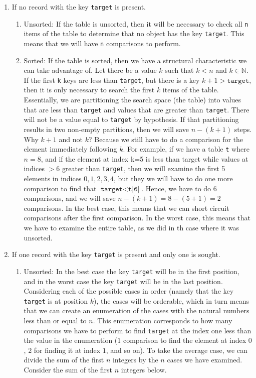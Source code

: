 \documentclass[10pt,letterpaper,final]{report}
\begin{document}
\begin{enumerate}
  \item If no record with the key \texttt{target} is present.
        \begin{enumerate}
          \item Unsorted: If the table is unsorted, then it will be necessary to check all \texttt{n} items of the table to determine that no object has the key \texttt{target}. This means that we will have \texttt{n} comparisons to perform.
          \item Sorted: If the table is sorted, then we have a structural characteristic we can take advantage of. Let there be a value $k$ such that $k < n$ and $k \in \mathbb{N}$. If the first \texttt{k} keys are less than \texttt{target}, but there is a key $k+1 > \texttt{target}$, then it is only necessary to search the first $k$ items of the table. Essentially, we are partitioning the search space (the table) into values that are less than \texttt{target} and values that are greater than \texttt{target}. There will not be a value equal to \texttt{target} by hypothesis. If that partitioning results in two non-empty partitions, then we will save $n-(k+1)$ steps. Why $k+1$ and not $k$? Because we still have to do a comparison for the element immediately following $k$. For example, if we have a table \texttt{t} where $n = 8$, and if the element at index k=5 is less than target while values at indices $> 6$ greater than \texttt{target}, then we will examine the first 5 elements in indices $0,1,2,3,4$, but they we will have to do one more comparison to find that $\texttt{target} < \texttt{t[6]}$. Hence, we have to do 6 comparisons, and we will save $n-(k+1) = 8 - (5+1) = 2$ comparisons. In the best case, this means that we can short circuit comparisons after the first comparison. In the worst case, this means that we have to examine the entire table, as we did in th case where it was unsorted.
        \end{enumerate}
  \item If one record with the key \texttt{target} is present and only one is sought.
        \begin{enumerate}
          \item Unsorted: In the best case the key \texttt{target} will be in the first position, and in the worst case the key \texttt{target} will be in the last position. Considering each of the possible cases in order (namely that the key \texttt{target} is at position $k$), the cases will be orderable, which in turn means that we can create an enumeration of the cases with the natural numbers less than or equal to $n$. This enumeration corresponds to how many comparisons we have to perform to find \texttt{target} at the index one less than the value in the enumeration ($1$ comparison to find the element at index $0$, $2$ for finding it at index $1$, and so on). To take the average case, we can divide the sum of the first $n$ integers by the $n$ cases we have examined. Consider the sum of the first $n$ integers below.

\end{enumerate}
\end{enumerate}
\end{document}
